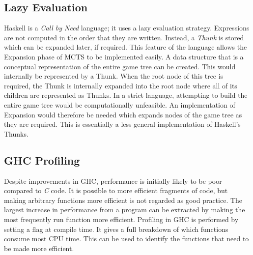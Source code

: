\subsection{Lazy Evaluation}
Haskell is a \textit{Call by Need} language; it uses a lazy evaluation strategy. Expressions are not computed in the order that they are written. Instead, a \textit{Thunk} is stored which can be expanded later, if required. This feature of the language allows the {Expansion} phase of {MCTS} to be implemented easily.  A data structure that is a conceptual representation of the entire game tree can be created. This would internally be represented by a {Thunk}. When the root node of this tree is required, the {Thunk} is internally expanded into the root node where all of its children are represented as {Thunks}. In a strict language, attempting to build the entire game tree would be computationally unfeasible. An implementation of Expansion would therefore be needed which expands nodes of the game tree as they are required. This is essentially a less general implementation of {Haskell}'s {Thunks}.


\subsection{{GHC} Profiling}
Despite improvements in {GHC}, performance is initially likely to be poor compared to \textit{C} code. It is possible to more efficient fragments of code, but making arbitrary functions more efficient is not regarded as good practice. The largest increase in performance from a program can be extracted by making the most frequently run function more efficient. Profiling in {GHC} is performed by setting a flag at compile time. It gives a full breakdown of which functions consume most CPU time. This can be used to identify the functions that need to be made more efficient.


